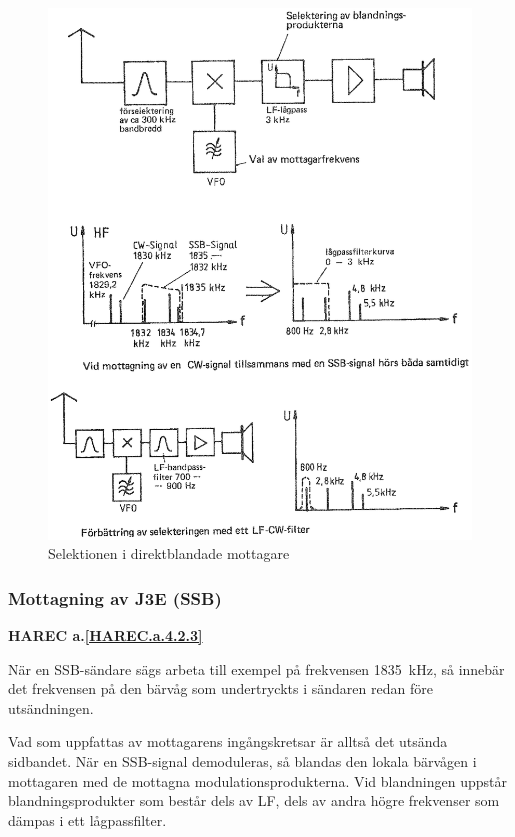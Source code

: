 \begin{figure}
  \includegraphics[width=\textwidth]{images/cropped_pdfs/bild_2_4-11.pdf}
  \caption{Selektionen i direktblandade mottagare}
  \label{fig:bildII4-11}
\end{figure}

\subsubsection{Mottagning av J3E (SSB)}
\textbf{HAREC a.\ref{HAREC.a.4.2.3}\label{myHAREC.a.4.2.3}}

När en SSB-sändare sägs arbeta till exempel på frekvensen 1835~kHz, så
innebär det frekvensen på den bärvåg som undertryckts i sändaren redan
före utsändningen.

Vad som uppfattas av mottagarens ingångskretsar är alltså det utsända sidbandet.
När en SSB-signal demoduleras, så blandas den lokala bärvågen i mottagaren med
de mottagna modulationsprodukterna.
Vid blandningen uppstår blandningsprodukter som består dels av LF, dels av
andra högre frekvenser som dämpas i ett lågpassfilter.

